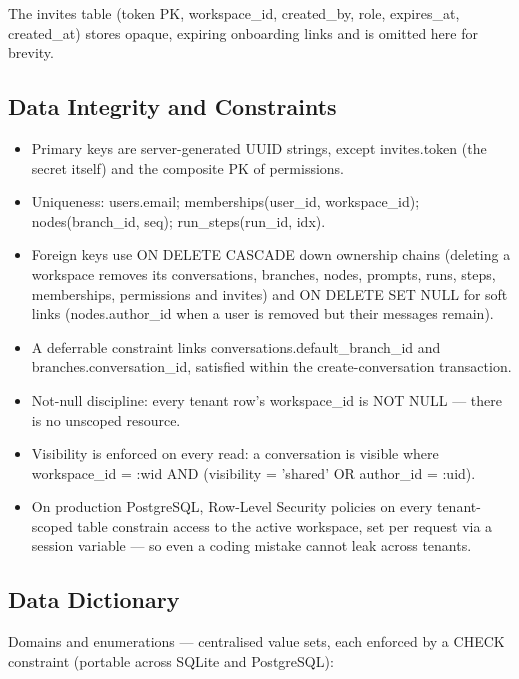 \documentclass[12pt,a4paper]{report}
\begin{document}
The invites table (token PK, workspace\_id, created\_by, role, expires\_at, created\_at) stores opaque, expiring onboarding links and is omitted here for brevity.

\subsection{Data Integrity and Constraints}
\begin{itemize}
  \item Primary keys are server-generated UUID strings, except invites.token (the secret itself) and the composite PK of permissions.
  \item Uniqueness: users.email; memberships(user\_id, workspace\_id); nodes(branch\_id, seq); run\_steps(run\_id, idx).
  \item Foreign keys use ON DELETE CASCADE down ownership chains (deleting a workspace removes its conversations, branches, nodes, prompts, runs, steps, memberships, permissions and invites) and ON DELETE SET NULL for soft links (nodes.author\_id when a user is removed but their messages remain).
  \item A deferrable constraint links conversations.default\_branch\_id and branches.conversation\_id, satisfied within the create-conversation transaction.
  \item Not-null discipline: every tenant row's workspace\_id is NOT NULL --- there is no unscoped resource.
  \item Visibility is enforced on every read: a conversation is visible where workspace\_id = :wid AND (visibility = 'shared' OR author\_id = :uid).
  \item On production PostgreSQL, Row-Level Security policies on every tenant-scoped table constrain access to the active workspace, set per request via a session variable --- so even a coding mistake cannot leak across tenants.
\end{itemize}

\subsection{Data Dictionary}
Domains and enumerations --- centralised value sets, each enforced by a CHECK constraint (portable across SQLite and PostgreSQL):
\end{document}
